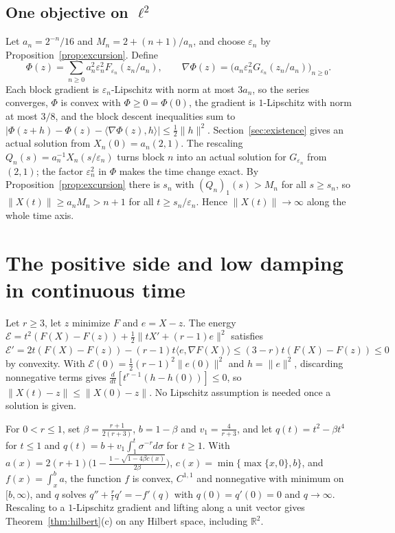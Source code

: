 \documentclass[11pt]{article}
\numberwithin{equation}{section}
\theoremstyle{definition}
\theoremstyle{remark}
\newcommand{\R}{\mathbb R}
\newcommand{\ip}[2]{\langle #1,#2\rangle}
\newcommand{\norm}[1]{\lVert #1\rVert}
\newcommand{\eps}{\varepsilon}
\begin{document}
\subsection{One objective on \texorpdfstring{$\ell^2$}{l2}}
Let $a_n=2^{-n}/16$ and $M_n=2+(n+1)/a_n$, and choose $\eps_n$ by Proposition~\ref{prop:excursion}. Define
\[
\Phi(z)=\sum_{n\ge0}a_n^2\eps_n^2F_{\eps_n}(z_n/a_n),\qquad \nabla\Phi(z)=\bigl(a_n\eps_n^2G_{\eps_n}(z_n/a_n)\bigr)_{n\ge0}.
\]
Each block gradient is $\eps_n$-Lipschitz with norm at most $3a_n$, so the series converges, $\Phi$ is convex with $\Phi\ge0=\Phi(0)$, the gradient is $1$-Lipschitz with norm at most $3/8$, and the block descent inequalities sum to $|\Phi(z+h)-\Phi(z)-\ip{\nabla\Phi(z)}h|\le\frac12\norm h^2$. Section~\ref{sec:existence} gives an actual solution from $X_n(0)=a_n(2,1)$. The rescaling $Q_n(s)=a_n^{-1}X_n(s/\eps_n)$ turns block $n$ into an actual solution for $G_{\eps_n}$ from $(2,1)$; the factor $\eps_n^2$ in $\Phi$ makes the time change exact. By Proposition~\ref{prop:excursion} there is $s_n$ with $(Q_n)_1(s)>M_n$ for all $s\ge s_n$, so $\norm{X(t)}\ge a_nM_n>n+1$ for all $t\ge s_n/\eps_n$. Hence $\norm{X(t)}\to\infty$ along the whole time axis.

\section{The positive side and low damping in continuous time}\label{sec:positive}
Let $r\ge3$, let $z$ minimize $F$ and $e=X-z$. The energy $\mathcal E=t^2(F(X)-F(z))+\frac12\norm{tX'+(r-1)e}^2$ satisfies $\mathcal E'=2t(F(X)-F(z))-(r-1)t\ip{e}{\nabla F(X)}\le(3-r)t(F(X)-F(z))\le0$ by convexity. With $\mathcal E(0)=\frac12(r-1)^2\norm{e(0)}^2$ and $h=\norm e^2$, discarding nonnegative terms gives $\frac{d}{dt}[t^{r-1}(h-h(0))]\le0$, so $\norm{X(t)-z}\le\norm{X(0)-z}$. No Lipschitz assumption is needed once a solution is given.

For $0<r\le1$, set $\beta=\frac{r+1}{2(r+3)}$, $b=1-\beta$ and $v_1=\frac4{r+3}$, and let $q(t)=t^2-\beta t^4$ for $t\le1$ and $q(t)=b+v_1\int_1^t\sigma^{-r}d\sigma$ for $t\ge1$. With $a(x)=2(r+1)\bigl(1-\frac{1-\sqrt{1-4\beta c(x)}}{2\beta}\bigr)$, $c(x)=\min\{\max\{x,0\},b\}$, and $f(x)=\int_x^ba$, the function $f$ is convex, $C^{1,1}$ and nonnegative with minimum on $[b,\infty)$, and $q$ solves $q''+\frac rtq'=-f'(q)$ with $q(0)=q'(0)=0$ and $q\to\infty$. Rescaling to a $1$-Lipschitz gradient and lifting along a unit vector gives Theorem~\ref{thm:hilbert}(c) on any Hilbert space, including $\R^2$.
\end{document}

